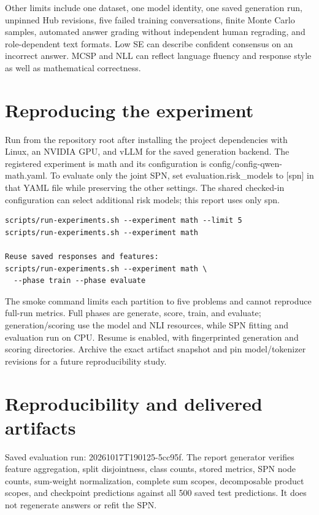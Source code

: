 \documentclass[11pt,a4paper]{article}
\begin{document}
Other limits include one dataset, one model identity, one saved generation run, unpinned Hub revisions, five failed training conversations, finite Monte Carlo samples, automated answer grading without independent human regrading, and role-dependent text formats. Low SE can describe confident consensus on an incorrect answer. MCSP and NLL can reflect language fluency and response style as well as mathematical correctness.

\section{Reproducing the experiment}
Run from the repository root after installing the project dependencies with Linux, an NVIDIA GPU, and vLLM for the saved generation backend. The registered experiment is math and its configuration is config/config-qwen-math.yaml. To evaluate only the joint SPN, set evaluation.risk\_models to [spn] in that YAML file while preserving the other settings. The shared checked-in configuration can select additional risk models; this report uses only spn.

\begin{verbatim}
scripts/run-experiments.sh --experiment math --limit 5
scripts/run-experiments.sh --experiment math

Reuse saved responses and features:
scripts/run-experiments.sh --experiment math \
  --phase train --phase evaluate
\end{verbatim}
The smoke command limits each partition to five problems and cannot reproduce full-run metrics. Full phases are generate, score, train, and evaluate; generation/scoring use the model and NLI resources, while SPN fitting and evaluation run on CPU. Resume is enabled, with fingerprinted generation and scoring directories. Archive the exact artifact snapshot and pin model/tokenizer revisions for a future reproducibility study.

\section{Reproducibility and delivered artifacts}
Saved evaluation run: 20261017T190125-5cc95f. The report generator verifies feature aggregation, split disjointness, class counts, stored metrics, SPN node counts, sum-weight normalization, complete sum scopes, decomposable product scopes, and checkpoint predictions against all 500 saved test predictions. It does not regenerate answers or refit the SPN.
\end{document}
